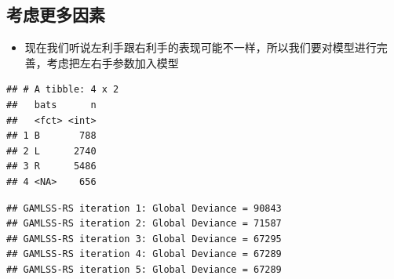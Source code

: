 \documentclass[]{book}
\newenvironment{Shaded}{\begin{snugshade}}{\end{snugshade}}
\newcommand{\CommentTok}[1]{\textcolor[rgb]{0.56,0.35,0.01}{\textit{#1}}}
\newcommand{\DataTypeTok}[1]{\textcolor[rgb]{0.13,0.29,0.53}{#1}}
\newcommand{\KeywordTok}[1]{\textcolor[rgb]{0.13,0.29,0.53}{\textbf{#1}}}
\newcommand{\NormalTok}[1]{#1}
\newcommand{\OperatorTok}[1]{\textcolor[rgb]{0.81,0.36,0.00}{\textbf{#1}}}
\newcommand{\StringTok}[1]{\textcolor[rgb]{0.31,0.60,0.02}{#1}}
\providecommand{\tightlist}{%
  \setlength{\itemsep}{0pt}\setlength{\parskip}{0pt}}
\begin{document}
\hypertarget{ux8003ux8651ux66f4ux591aux56e0ux7d20}{%
\subsection{考虑更多因素}\label{ux8003ux8651ux66f4ux591aux56e0ux7d20}}

\begin{itemize}
\tightlist
\item
  现在我们听说左利手跟右利手的表现可能不一样，所以我们要对模型进行完善，考虑把左右手参数加入模型
\end{itemize}

\begin{Shaded}
\end{Shaded}

\begin{verbatim}
## # A tibble: 4 x 2
##   bats      n
##   <fct> <int>
## 1 B       788
## 2 L      2740
## 3 R      5486
## 4 <NA>    656
\end{verbatim}

\begin{Shaded}
\end{Shaded}

\begin{verbatim}
## GAMLSS-RS iteration 1: Global Deviance = 90843 
## GAMLSS-RS iteration 2: Global Deviance = 71587 
## GAMLSS-RS iteration 3: Global Deviance = 67295 
## GAMLSS-RS iteration 4: Global Deviance = 67289 
## GAMLSS-RS iteration 5: Global Deviance = 67289
\end{verbatim}
\end{document}

